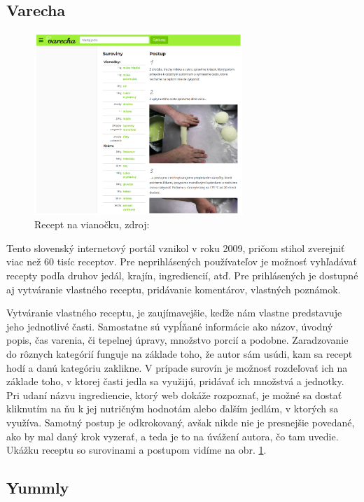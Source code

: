 {\subsection{Varecha}

\begin{figure}[h]
\centering
\includegraphics[width=0.7\textwidth]{images/varecha}
\caption{Recept na vianočku, zdroj: \cite{varecha}}
\label{varecha}
\end{figure}

Tento slovenský internetový portál \cite{varecha} vznikol v roku 2009, pričom stihol zverejniť viac
než 60 tisíc receptov. Pre neprihlásených používateľov je možnosť vyhľadávať recepty
podľa druhov jedál, krajín, ingrediencií, atď. Pre prihlásených je dostupné aj vytváranie
vlastného receptu, pridávanie komentárov, vlastných poznámok.

Vytváranie vlastného receptu, je zaujímavejšie, keďže nám vlastne predstavuje jeho
jednotlivé časti. Samostatne sú vypĺňané informácie ako názov, úvodný popis, čas varenia, či tepelnej úpravy, množstvo porcií a podobne. Zaradzovanie do rôznych kategórií
funguje na základe toho, že autor sám usúdi, kam sa recept hodí a danú kategóriu
zaklikne. V prípade surovín je možnosť rozdeľovať ich na základe toho, v ktorej časti
jedla sa využijú, pridávať ich množstvá a jednotky. Pri udaní názvu ingrediencie, ktorý
web dokáže rozpoznať, je možné sa dostať kliknutím na ňu k jej nutričným hodnotám
alebo ďalším jedlám, v ktorých sa využíva. Samotný postup je odkrokovaný, avšak nikde nie je presnejšie povedané, ako by mal daný krok vyzerať, a teda je to na úvážení
autora, čo tam uvedie. Ukážku receptu so surovinami a postupom vidíme na obr. \ref{varecha}.

\subsection{Yummly}

}
